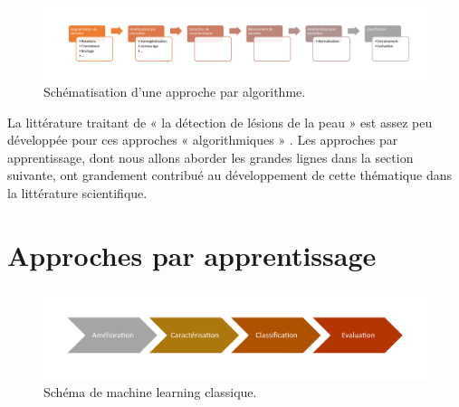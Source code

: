 \begin{figure}[H]
    \centering
    \includegraphics[width=\linewidth]{contents/chapter_3/resources/classic_pipeline.pdf}
    \caption{Schématisation d’une approche par algorithme.}
    \label{fig:standard_process}
\end{figure}\par

La littérature traitant de « la détection de lésions de la peau » est assez peu développée pour ces approches « algorithmiques » \cite{Moss1989}. Les approches par apprentissage, dont nous allons aborder les grandes lignes dans la section suivante, ont grandement contribué au développement de cette thématique dans la littérature scientifique.\par

\section{Approches par apprentissage}

\begin{figure}[H]
    \centering
    \includegraphics[width=\linewidth]{contents/chapter_3/resources/pipeline_machine_learning.pdf}
    \caption{Schéma de machine learning classique.}
    \label{fig:pipeline_machine_learning}
\end{figure}

